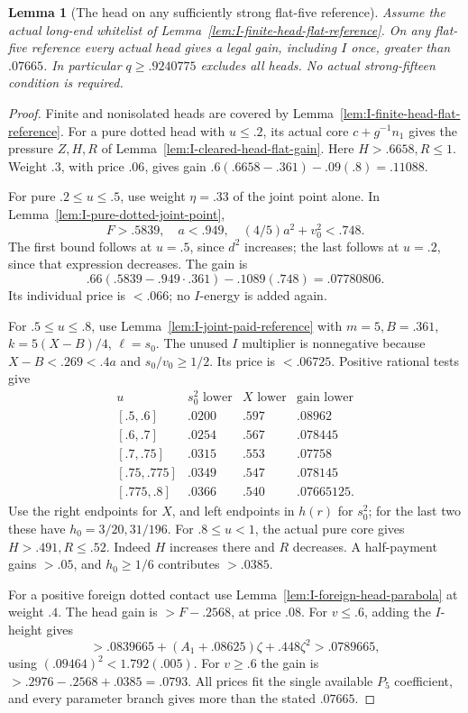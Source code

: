 \documentclass[11pt]{article}
\newtheorem{lemma}[theorem]{Lemma}
\theoremstyle{definition}
\theoremstyle{remark}
\begin{document}
\begin{lemma}[The head on any sufficiently strong flat-five reference]
\label{lem:I-head-flat-reference}
Assume the actual long-end whitelist of
Lemma~\ref{lem:I-finite-head-flat-reference}.
On any flat-five reference every actual head gives a legal gain,
including \(I\) once, greater than \(.07665\).
In particular \(q\ge.9240775\) excludes all heads.
No actual strong-fifteen condition is required.
\end{lemma}
\begin{proof}
Finite and nonisolated heads are covered by
Lemma~\ref{lem:I-finite-head-flat-reference}. For a pure dotted head
with \(u\le.2\), its actual core \(c+g^{-1}n_1\) gives the
pressure \(Z,H,R\) of Lemma~\ref{lem:I-cleared-head-flat-gain}.
Here \(H>.6658,R\le1\). Weight \(.3\), with price \(.06\),
gives gain \(.6(.6658-.361)-.09(.8)=.11088\).

For pure \(.2\le u\le.5\), use weight \(\eta=.33\) of the
joint point alone. In Lemma~\ref{lem:I-pure-dotted-joint-point},
\[
 F>.5839,\quad a<.949,\quad (4/5)a^2+v_0^2<.748.
\]
The first bound follows at \(u=.5\), since \(d^2\) increases;
the last follows at \(u=.2\), since that expression decreases.
The gain is
\[
 .66(.5839-.949\cdot.361)-.1089(.748)=.07780806.
\]
Its individual price is \(<.066\); no \(I\)-energy is added again.

For \(.5\le u\le.8\), use
Lemma~\ref{lem:I-joint-paid-reference} with \(m=5,B=.361\),
\(k=5(X-B)/4\), \(\ell=s_0\). The unused \(I\) multiplier
is nonnegative because \(X-B<.269<.4a\) and \(s_0/v_0\ge1/2\).
Its price is \(<.06725\). Positive rational tests give
\[
\begin{array}{c|c|c|c}
u&s_0^2\text{ lower}&X\text{ lower}&\text{gain lower}\\ \hline
{}[.5,.6]&.0200&.597&.08962\\
{}[.6,.7]&.0254&.567&.078445\\
{}[.7,.75]&.0315&.553&.07758\\
{}[.75,.775]&.0349&.547&.078145\\
{}[.775,.8]&.0366&.540&.07665125.
\end{array}
\]
Use the right endpoints for \(X\), and left endpoints in \(h(r)\)
for \(s_0^2\); for the last two these have \(h_0=3/20,31/196\).
For \(.8\le u<1\), the actual pure core gives \(H>.491,R\le.52\).
Indeed \(H\) increases there and \(R\) decreases. A half-payment
gains \(>.05\), and \(h_0\ge1/6\) contributes \(>.0385\).

For a positive foreign dotted contact use
Lemma~\ref{lem:I-foreign-head-parabola} at weight \(.4\).
The head gain is \(>F-.2568\), at price \(.08\).
For \(v\le.6\), adding the \(I\)-height gives
\[
 >.0839665+(A_1+.08625)\zeta+.448\zeta^2>.0789665,
\]
using \((.09464)^2<1.792(.005)\).
For \(v\ge.6\) the gain is \(>.2976-.2568+.0385=.0793\).
All prices fit the single available \(P_5\) coefficient, and every
parameter branch gives more than the stated \(.07665\).
\end{proof}
\end{document}
